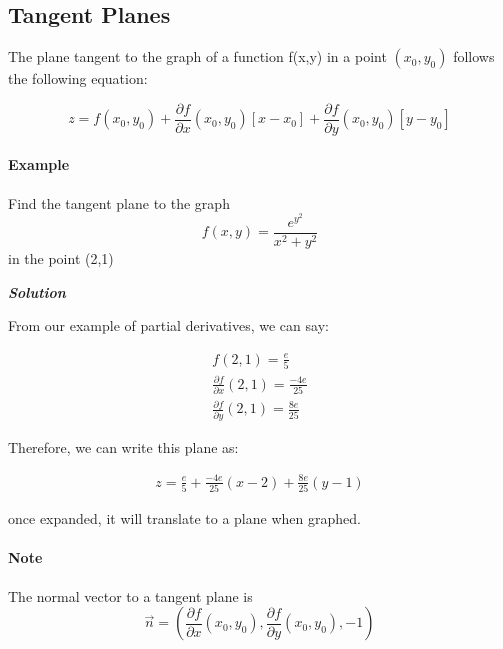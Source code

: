 \documentclass[11pt,fleqn]{book} %
\begin{document}
\subsection{Tangent Planes}

The plane tangent to the graph of a function f(x,y) in a point $(x_0, y_0)$
follows the following equation:

$$z = f(x_0, y_0) + \frac{\partial f}{\partial x} (x_0, y_0) [x - x_0] + \frac{\partial f}{\partial y} (x_0, y_0) [y - y_0] $$

\paragraph{Example}

Find the tangent plane to the graph $$f(x,y) = \frac{e^{y^{2}}}{x^2+y^2}$$ in the point (2,1)

\textit{\textbf{Solution}}

From our example of partial derivatives, we can say:

\begin{gather}
    f(2,1) = \frac{e}{5}\\
    \frac{\partial f}{\partial x} (2,1) =  \frac{-4e}{25}\\
    \frac{\partial f}{\partial y} (2,1) =  \frac{8e}{25}
\end{gather}

Therefore, we can write this plane as:

\begin{gather}
    z = \frac{e}{5} + \frac{-4e}{25}(x - 2) + \frac{8e}{25}(y - 1)
\end{gather}

once expanded, it will translate to a plane when graphed.

\paragraph*{Note}

The normal vector to a tangent plane is $$\vec{n} = (\frac{\partial f}{\partial x} (x_0, y_0), \frac{\partial f}{\partial y} (x_0, y_0), -1)$$
\end{document}
